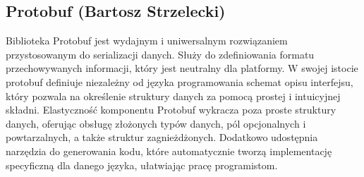 \subsection{Protobuf (Bartosz Strzelecki)}

Biblioteka Protobuf jest wydajnym i uniwersalnym rozwiązaniem przystosowanym do serializacji
danych. Służy do zdefiniowania formatu przechowywanych informacji, który jest neutralny dla platformy.
W swojej istocie protobuf definiuje niezależny od języka programowania schemat opisu interfejsu,
który pozwala na określenie struktury danych za pomocą prostej i intuicyjnej składni.
Elastyczność komponentu Protobuf wykracza poza proste struktury danych, oferując obsługę złożonych typów danych, pól opcjonalnych i powtarzalnych,
a także struktur zagnieżdżonych. Dodatkowo udostępnia narzędzia do generowania kodu,
które automatycznie tworzą implementację specyficzną dla danego języka, ułatwiając pracę programistom.

